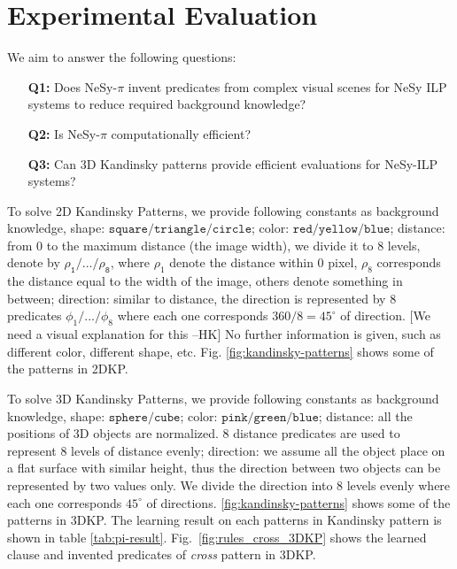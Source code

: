 \documentclass[
]{ceurart}
\newcommand{\dd}[1]{\textcolor{red}{[#1 \textsc{--Dev}]}}
\newcommand{\hk}[1]{\textcolor{Apricot}{[#1 \textsc{--HK}]}}
\begin{document}
	\section{Experimental Evaluation}
	We aim to answer the following questions:
	\begin{enumerate}
		\item[\textbf{Q1:}] Does NeSy-$\pi$ invent predicates from complex visual scenes for NeSy ILP systems to reduce required background knowledge?
		\item[\textbf{Q2:}] Is NeSy-$\pi$ computationally efficient?
		\item[\textbf{Q3:}] Can 3D Kandinsky patterns provide efficient evaluations for NeSy-ILP systems?
	\end{enumerate}
	To solve 2D Kandinsky Patterns, we provide following constants as background knowledge, 
	shape: $\mathtt{square/triangle/circle}$; 
	color: $\mathtt{red/yellow/blue}$; 
	distance: from 0 to the maximum distance (the image width), we divide it to 8 levels, denote by $\mathtt{\rho_1/.../\rho_8}$, where $\rho_1 $ denote the distance within 0 pixel, $\rho_8$ corresponds the distance equal to the width of the image, others denote something in between; 
	direction: similar to distance, the direction is represented by 8 predicates $\phi_1/.../\phi_8 $ where each one corresponds $360/8=45^\circ$ of direction. \hk{We need a visual explanation for this}
	No further information is given, such as different color, different shape, etc. Fig. \ref{fig:kandinsky-patterns} shows some of the patterns in 2DKP. 
	
	To solve 3D Kandinsky Patterns, we provide following constants as background knowledge, 
	shape: $\mathtt{sphere/cube}$; 
	color: $\mathtt{pink/green/blue}$; 
	distance: all the positions of 3D objects are normalized. 8 distance predicates  are used to represent 8 levels of distance evenly;
	direction: we assume all the object place on a flat surface with similar height, thus the direction between two objects can be represented by two values only. We divide the direction into 8 levels evenly where each one corresponds $45^\circ$ of directions.
	\ref{fig:kandinsky-patterns} shows some of the patterns in 3DKP.
	The learning result on each patterns in Kandinsky pattern is shown in table \ref{tab:pi-result}.
	Fig.~\ref{fig:rules_cross_3DKP} shows the learned clause and invented predicates of \textit{cross} pattern in 3DKP.
	
\end{document}

